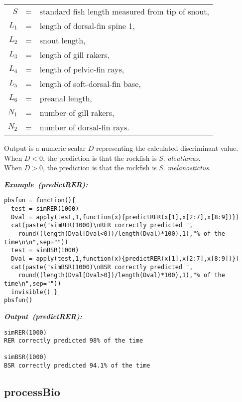 \documentclass[letterpaper,12pt,fleqn]{article}
\newcommand\example[1]{    %
	\textbf{\emph{Example~(#1):}}\\ \vspace{3 pt}
}
\newcommand\results[1]{    %
	\textbf{\emph{Output~(#1):}}\\ \vspace{3 pt}
}
\begin{document}
\begin{tabular}{rll}
    $S$   & = & standard fish length measured from tip of snout,\\
    $L_1$ & = & length of dorsal-fin spine 1,\\
    $L_2$ & = & snout length,\\
    $L_3$ & = & length of gill rakers,\\
    $L_4$ & = & length of pelvic-fin rays,\\
    $L_5$ & = & length of soft-dorsal-fin base,\\
    $L_6$ & = & preanal length,\\
    $N_1$ & = & number of gill rakers,\\
    $N_2$ & = & number of dorsal-fin rays.\\
\end{tabular}

Output is a numeric scalar $D$ representing the calculated discriminant value.\\
When $D < 0$, the prediction is that the rockfish is \emph{S. aleutianus}.\\
When $D > 0$, the prediction is that the rockfish is \emph{S. melanostictus}.

\begin{examplebox}
\example{predictRER}
\begin{Verbatim}[fontsize=\footnotesize]
pbsfun = function(){
  test = simRER(1000)
  Dval = apply(test,1,function(x){predictRER(x[1],x[2:7],x[8:9])})
  cat(paste("simRER(1000)\nRER correctly predicted ",
    round((length(Dval[Dval<0])/length(Dval)*100),1),"% of the time\n\n",sep=""))
  test = simBSR(1000)
  Dval = apply(test,1,function(x){predictRER(x[1],x[2:7],x[8:9])})
  cat(paste("simBSR(1000)\nBSR correctly predicted ",
    round((length(Dval[Dval>0])/length(Dval)*100),1),"% of the time\n",sep=""))
  invisible() }
pbsfun()
\end{Verbatim}
\end{examplebox}

\begin{outputbox}
\results{predictRER}
\begin{Verbatim}[fontsize=\footnotesize]
simRER(1000)
RER correctly predicted 98% of the time

simBSR(1000)
BSR correctly predicted 94.1% of the time
\end{Verbatim}
\end{outputbox}

\subsection {processBio}
\end{document}
